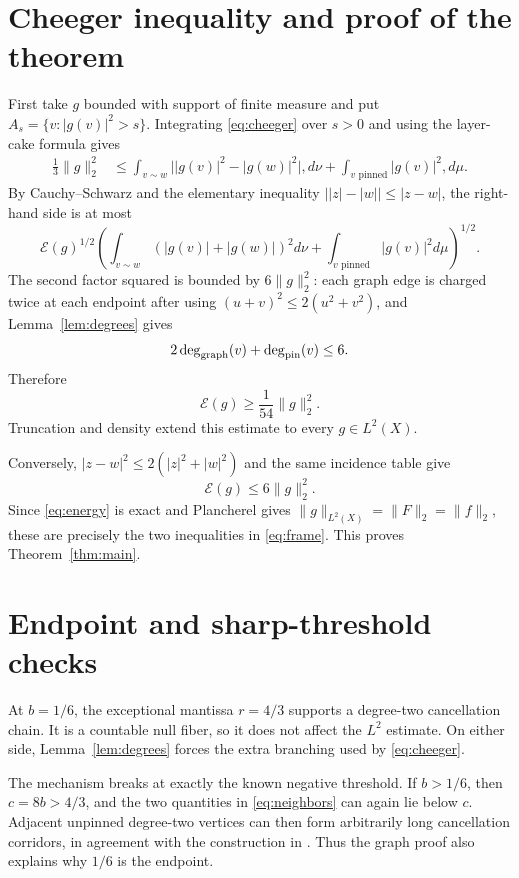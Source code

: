 \documentclass[11pt]{article}
\newcommand{\E}{\mathcal E}
\begin{document}
\section{Cheeger inequality and proof of the theorem}

First take $g$ bounded with support of finite measure and put
$A_s=\{v:|g(v)|^2>s\}$.  Integrating \eqref{eq:cheeger} over $s>0$ and using
the layer-cake formula gives
\begin{align}
 \frac13\|g\|_2^2
 &\leq
 \int_{v\sim w}\big||g(v)|^2-|g(w)|^2\big|,d\nu
 +\int_{v\text{ pinned}}|g(v)|^2,d\mu.\label{eq:coarea}
\end{align}
By Cauchy--Schwarz and the elementary inequality
$\big||z|-|w|\big|\leq|z-w|$, the right-hand side is at most
\begin{equation}\label{eq:cs}
 \E(g)^{1/2}
 \left(
 \int_{v\sim w}(|g(v)|+|g(w)|)^2d\nu
 +\int_{v\text{ pinned}}|g(v)|^2d\mu
 \right)^{1/2}.
\end{equation}
The second factor squared is bounded by $6\|g\|_2^2$: each graph edge is
charged twice at each endpoint after using $(u+v)^2\leq2(u^2+v^2)$, and
Lemma~\ref{lem:degrees} gives
\[
 2\deg_{\rm graph}(v)+\deg_{\rm pin}(v)\leq6.
\]
Therefore
\[
 \E(g)\geq\frac1{54}\|g\|_2^2.
\]
Truncation and density extend this estimate to every $g\in L^2(X)$.

Conversely, $|z-w|^2\leq2(|z|^2+|w|^2)$ and the same incidence table give
\[
 \E(g)\leq6\|g\|_2^2.
\]
Since \eqref{eq:energy} is exact and Plancherel gives
$\|g\|_{L^2(X)}=\|F\|_2=\|f\|_2$, these are precisely the two inequalities
in \eqref{eq:frame}.  This proves Theorem~\ref{thm:main}.

\section{Endpoint and sharp-threshold checks}

At $b=1/6$, the exceptional mantissa $r=4/3$ supports a degree-two
cancellation chain.  It is a countable null fiber, so it does not affect the
$L^2$ estimate.  On either side, Lemma~\ref{lem:degrees} forces the extra
branching used by \eqref{eq:cheeger}.

The mechanism breaks at exactly the known negative threshold.  If $b>1/6$,
then $c=8b>4/3$, and the two quantities in \eqref{eq:neighbors} can again lie
below $c$.  Adjacent unpinned degree-two vertices can then form arbitrarily
long cancellation corridors, in agreement with the construction in
\cite{BW}.  Thus the graph proof also explains why $1/6$ is the endpoint.
\end{document}

